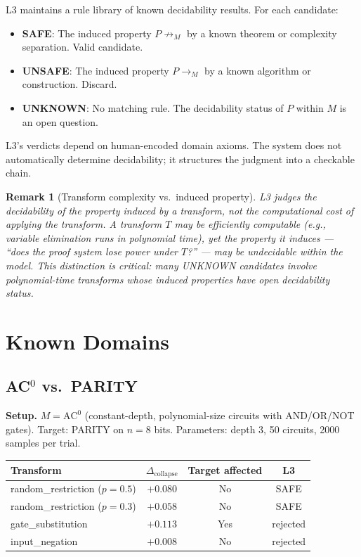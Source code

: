 \documentclass[11pt,a4paper]{article}
\newtheorem{remark}[theorem]{Remark}
\newcommand{\derivM}{\rightarrow_M}           %
\newcommand{\unreachM}{\not\rightarrow_M}     %
\newcommand{\Dcollapse}{\Delta_{\mathrm{collapse}}}
\begin{document}
L3 maintains a rule library of known decidability results. For each candidate:
\begin{itemize}[nosep]
    \item \textbf{SAFE}: The induced property $P \unreachM$ by a known theorem or complexity separation. Valid candidate.
    \item \textbf{UNSAFE}: The induced property $P \derivM$ by a known algorithm or construction. Discard.
    \item \textbf{UNKNOWN}: No matching rule. The decidability status of $P$ within $M$ is an open question.
\end{itemize}

L3's verdicts depend on human-encoded domain axioms. The system does not automatically determine decidability; it structures the judgment into a checkable chain.

\begin{remark}[Transform complexity vs.\ induced property]
L3 judges the decidability of the \emph{property induced by} a transform, not the computational cost of \emph{applying} the transform. A transform $T$ may be efficiently computable (e.g., variable elimination runs in polynomial time), yet the property it induces --- ``does the proof system lose power under $T$?'' --- may be undecidable within the model. This distinction is critical: many UNKNOWN candidates involve polynomial-time transforms whose induced properties have open decidability status.
\end{remark}

\section{Known Domains}
\label{sec:known}

\subsection{AC$^0$ vs.\ PARITY}

\textbf{Setup.} $M = \mathrm{AC}^0$ (constant-depth, polynomial-size circuits with AND/OR/NOT gates). Target: PARITY on $n = 8$ bits. Parameters: depth 3, 50 circuits, 2000 samples per trial.

\begin{center}
\begin{tabular}{@{}lccc@{}}
\toprule
Transform & $\Dcollapse$ & Target affected & L3 \\
\midrule
random\_restriction ($p=0.5$) & $+0.080$ & No & SAFE \\
random\_restriction ($p=0.3$) & $+0.058$ & No & SAFE \\
gate\_substitution & $+0.113$ & Yes & rejected \\
input\_negation & $+0.008$ & No & rejected \\
\bottomrule
\end{tabular}
\end{center}
\end{document}
